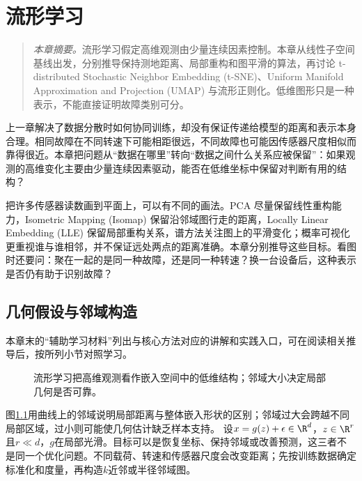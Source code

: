﻿\chapter{流形学习}
\label{chap:manifold}
\begin{quote}\small
\textit{本章摘要。}流形学习假定高维观测由少量连续因素控制。本章从线性子空间基线出发，分别推导保持测地距离、局部重构和图平滑的算法，再讨论 t-distributed Stochastic Neighbor Embedding (t-SNE)、Uniform Manifold Approximation and Projection (UMAP) 与流形正则化。低维图形只是一种表示，不能直接证明故障类别可分。
\end{quote}

上一章解决了数据分散时如何协同训练，却没有保证传递给模型的距离和表示本身合理。相同故障在不同转速下可能相距很远，不同故障也可能因传感器尺度相似而靠得很近。本章把问题从“数据在哪里”转向“数据之间什么关系应被保留”：如果观测的高维变化主要由少量连续因素驱动，能否在低维坐标中保留对判断有用的结构？

把许多传感器读数画到平面上，可以有不同的画法。PCA 尽量保留线性重构能力，Isometric Mapping (Isomap) 保留沿邻域图行走的距离，Locally Linear Embedding (LLE) 保留局部重构关系，谱方法关注图上的平滑变化；概率可视化更重视谁与谁相邻，并不保证远处两点的距离准确。本章分别推导这些目标。看图时还要问：聚在一起的是同一种故障，还是同一种转速？换一台设备后，这种表示是否仍有助于识别故障？

\section{几何假设与邻域构造}

本章末的“辅助学习材料”列出与核心方法对应的讲解和实践入口，可在阅读相关推导后，按所列小节对照学习。

\begin{figure}[htbp]
\centering
{}
\caption{流形学习把高维观测看作嵌入空间中的低维结构；邻域大小决定局部几何是否可靠。}
\label{fig:manifold-local-geometry}
\end{figure}
图\ref{fig:manifold-local-geometry}用曲线上的邻域说明局部距离与整体嵌入形状的区别；邻域过大会跨越不同局部区域，过小则可能使几何估计缺乏样本支持。
设$x=g(z)+\epsilon\in\R^d$，$z\in\R^r$且$r\ll d$，$g$在局部光滑。目标可以是恢复坐标、保持邻域或改善预测，这三者不是同一个优化问题。不同载荷、转速和传感器尺度会改变距离；先按训练数据确定标准化和度量，再构造$k$近邻或半径邻域图。

